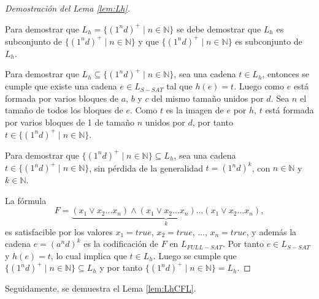 \begin{proof}[Demostración del Lema \ref{lem:Lh}] \
    
    Para demostrar que $L_h=\{(1^nd)^+\mid n\in \mathbb{N}\}$ se debe demostrar que $L_h$ es subconjunto de $\{(1^nd)^+\mid n\in \mathbb{N}\}$ y 
    que $\{(1^nd)^+\mid n\in \mathbb{N}\}$ es subconjunto de $L_h$.
    
    Para demostrar que $L_h\subseteq \{(1^nd)^+\mid n\in \mathbb{N}\}$, sea una cadena $t\in L_h$, entonces se cumple que existe una cadena $e\in L_{S-SAT}$ tal que $h(e)=t$. Luego como $e$ está formada por varios bloques de $a$, $b$ y $c$ del mismo tamaño unidos por $d$. Sea $n$ el tamaño de todos los bloques de $e$. Como $t$ es la imagen de $e$ por $h$, $t$ está formada por varios bloques de 1 de tamaño $n$ unidos por $d$, por tanto $t\in \{(1^nd)^+\mid n\in \mathbb{N}\}$.
    
    Para demostrar que $\{(1^nd)^+\mid n\in \mathbb{N}\}\subseteq L_h$, sea una cadena $t\in \{(1^nd)^+\mid n\in \mathbb{N}\}$, sin pérdida de la generalidad $t=(1^nd)^k$, con $n\in \mathbb{N}$ y $k\in \mathbb{N}$.
    
    La fórmula
    $$F=\underbrace{(x_1\vee x_2 \ldots x_n) \wedge (x_1\vee x_2 \ldots x_n) \ldots (x_1\vee x_2 \ldots x_n)}_{k},$$
    es satisfacible por los valores $x_1=true$, $x_2=true$, $\ldots$, $x_n=true$, y además la cadena $e=(a^nd)^k$ es la codificación de $F$ en $L_{FULL-SAT}$. Por tanto $e\in L_{S-SAT}$ y $h(e)=t$, lo cual implica que $t\in L_h$. Luego se cumple que $\{(1^nd)^+\mid n\in \mathbb{N}\}\subseteq L_h$ y por tanto $\{(1^nd)^+\mid n\in \mathbb{N}\}= L_h$.
\end{proof}

Seguidamente, se demuestra el Lema \ref{lem:LhCFL}.

